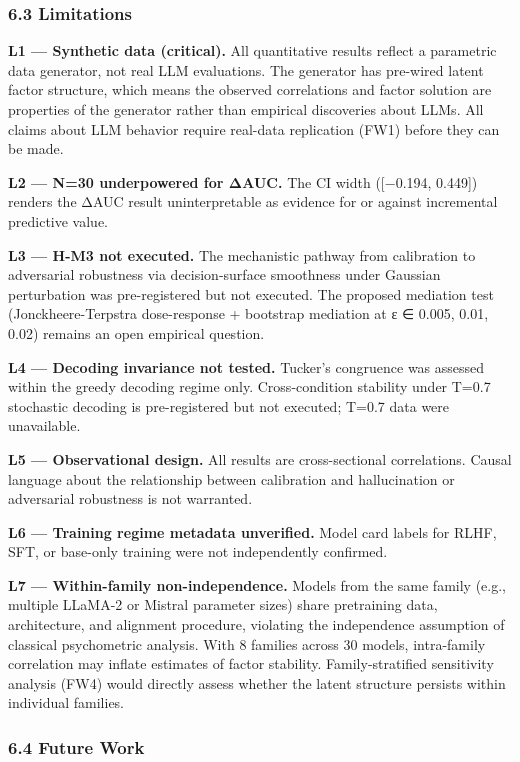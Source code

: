 \subsubsection{6.3 Limitations}

\textbf{L1 — Synthetic data (critical).} All quantitative results reflect a parametric data generator, not real LLM evaluations. The generator has pre-wired latent factor structure, which means the observed correlations and factor solution are properties of the generator rather than empirical discoveries about LLMs. All claims about LLM behavior require real-data replication (FW1) before they can be made.

\textbf{L2 — N=30 underpowered for ΔAUC.} The CI width ([−0.194, 0.449]) renders the ΔAUC result uninterpretable as evidence for or against incremental predictive value.

\textbf{L3 — H-M3 not executed.} The mechanistic pathway from calibration to adversarial robustness via decision-surface smoothness under Gaussian perturbation was pre-registered but not executed. The proposed mediation test (Jonckheere-Terpstra dose-response + bootstrap mediation at ε ∈ {0.005, 0.01, 0.02}) remains an open empirical question.

\textbf{L4 — Decoding invariance not tested.} Tucker's congruence was assessed within the greedy decoding regime only. Cross-condition stability under T=0.7 stochastic decoding is pre-registered but not executed; T=0.7 data were unavailable.

\textbf{L5 — Observational design.} All results are cross-sectional correlations. Causal language about the relationship between calibration and hallucination or adversarial robustness is not warranted.

\textbf{L6 — Training regime metadata unverified.} Model card labels for RLHF, SFT, or base-only training were not independently confirmed.

\textbf{L7 — Within-family non-independence.} Models from the same family (e.g., multiple LLaMA-2 or Mistral parameter sizes) share pretraining data, architecture, and alignment procedure, violating the independence assumption of classical psychometric analysis. With 8 families across 30 models, intra-family correlation may inflate estimates of factor stability. Family-stratified sensitivity analysis (FW4) would directly assess whether the latent structure persists within individual families.

\subsubsection{6.4 Future Work}

